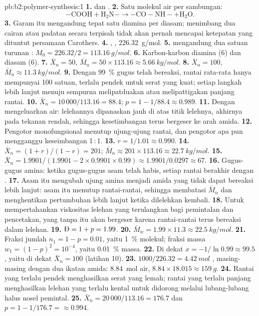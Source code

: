 \begin{solution}{pb:b2:polymer-synthesis:1}
\textbf{1.}  dan .
\textbf{2.} Satu molekul air per sambungan:
\[\mathrm{{-}COOH + H_2N{-} \longrightarrow {-}CO{-}NH{-} + H_2O}.\]
\textbf{3.} Garam itu mengandung tepat satu diamina per diasam; menimbang dua
cairan atau padatan secara terpisah tidak akan pernah mencapai ketepatan
yang dituntut persamaan Carothers.
\textbf{4.} \ce{-[NH(CH2)6NH-CO(CH2)4CO]-}, , \qty{226.32}{g/mol}.
\textbf{5.}  mengandung dua satuan turunan : $M_0 = 226.32/2 = \qty{113.16}{g/mol}$.
\textbf{6.} Karbon-karbon diamina (6) dan diasam (6).
\textbf{7.} $\bar X_n = 50$, $\bar M_n = 50 \times 113.16 \approx \qty{5.66}{kg/mol}$.
\textbf{8.} $\bar X_n = 100$, $\bar M_n \approx \qty{11.3}{kg/mol}$.
\textbf{9.} Dengan 99~\% gugus telah bereaksi, rantai rata-rata hanya
mempunyai 100 satuan, terlalu pendek untuk serat yang kuat; setiap langkah
lebih lanjut menuju  sempurna melipatduakan atau melipattigakan
panjang rantai.
\textbf{10.} $\bar X_n = 10\,000/113.16 = 88.4$; $p = 1 - 1/88.4 \approx 0.989$.
\textbf{11.} Dengan mengeluarkan air: lelehannya dipanaskan jauh di atas
titik lelehnya, akhirnya pada tekanan rendah, sehingga kesetimbangan terus
bergeser ke arah amida.
\textbf{12.} Pengotor monofungsional menutup ujung-ujung rantai, dan pengotor
apa pun mengganggu keseimbangan 1\,:\,1.
\textbf{13.} $r = 1/1.01 \approx 0.990$.
\textbf{14.} $\bar X_n = (1+r)/(1-r) = 201$; $\bar M_n \approx 201 \times 113.16 \approx
\qty{22.7}{kg/mol}$.
\textbf{15.} $\bar X_n = 1.9901/(1.9901 - 2 \times 0.9901 \times 0.99) \approx 1.9901/0.0297 \approx
67$.
\textbf{16.} Gugus-gugus amina: ketika gugus-gugus asam telah habis, setiap
rantai berakhir dengan .
\textbf{17.} Asam itu mengubah ujung amina menjadi amida yang tidak dapat
bereaksi lebih lanjut: asam itu menutup rantai-rantai, sehingga membatasi
$\bar M_n$ dan menghentikan pertumbuhan lebih lanjut ketika 
dilelehkan kembali.
\textbf{18.} Untuk mempertahankan viskositas lelehan yang terulangkan bagi
pemintalan dan pencetakan, yang tanpa itu akan bergeser karena rantai-rantai
terus bereaksi dalam lelehan.
\textbf{19.} $\text{\DH} = 1 + p = 1.99$.
\textbf{20.} $\bar M_w = 1.99 \times 11.3 \approx \qty{22.5}{kg/mol}$.
\textbf{21.} Fraksi jumlah $n_1 = 1 - p = 0.01$, yaitu 1~\% molekul; fraksi massa $w_1 = (1-p)^2 =
10^{-4}$, yaitu 0.01~\% massa.
\textbf{22.} Di dekat $x = -1/\ln 0.99 \approx 99.5$, yaitu di dekat $\bar X_n = 100$ (latihan 10).
\textbf{23.} $1000/226.32 = \qty{4.42}{mol}$ , masing-masing dengan
dua ikatan amida: \qty{8.84}{mol} air, $8.84 \times 18.015 \approx \qty{159}{g}$.
\textbf{24.} Rantai yang terlalu pendek menghasilkan serat yang lemah; rantai
yang terlalu panjang menghasilkan lelehan yang terlalu kental untuk didorong
melalui lubang-lubang halus nosel pemintal.
\textbf{25.} $\bar X_n = 20\,000/113.16 = 176.7$ dan $p = 1 - 1/176.7 = \boldsymbol{\approx 0.994}$.
\end{solution}
